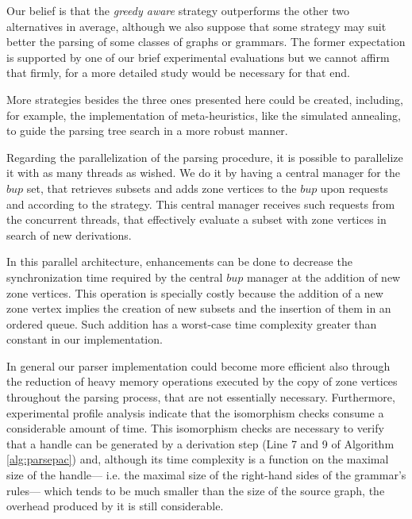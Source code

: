 Our belief is that the \emph{greedy aware} strategy outperforms the other two alternatives in average, although we also suppose that some strategy may suit better the parsing of some classes of graphs or grammars. The former expectation is supported by one of our brief experimental evaluations but we cannot affirm that firmly, for a more detailed study would be necessary for that end.

More strategies besides the three ones presented here could be created, including, for example, the implementation of meta-heuristics, like the simulated annealing, to guide the parsing tree search in a more robust manner.

Regarding the parallelization of the parsing procedure, it is possible to parallelize it with as many threads as wished. We do it by having a central manager for the $bup$ set, that retrieves subsets and adds zone vertices to the $bup$ upon requests and according to the strategy. This central manager receives such requests from the concurrent threads, that effectively evaluate a subset with zone vertices in search of new derivations.

In this parallel architecture, enhancements can be done to decrease the synchronization time required by the central $bup$ manager at the addition of new zone vertices. This operation is specially costly because the addition of a new zone vertex implies the creation of new subsets and the insertion of them in an ordered queue. Such addition has a worst-case time complexity greater than constant in our implementation.

In general our parser implementation could become more efficient also through the reduction of heavy memory operations executed by the copy of zone vertices throughout the parsing process, that are not essentially necessary. Furthermore, experimental profile analysis indicate that the isomorphism checks consume a considerable amount of time. This isomorphism checks are necessary to verify that a handle can be generated by a derivation step (Line 7 and 9 of Algorithm \ref{alg:parsepac}) and, although its time complexity is a function on the maximal size of the handle--- i.e. the maximal size of the right-hand sides of the grammar's rules--- which tends to be much smaller than the size of the source graph, the overhead produced by it is still considerable. 

